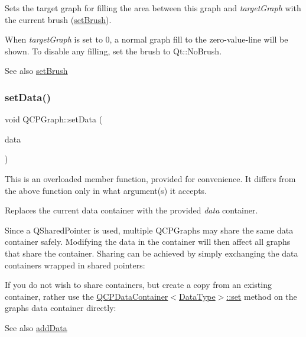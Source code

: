Sets the target graph for filling the area between this graph and {\itshape target\+Graph} with the current brush (\hyperlink{classQCPAbstractPlottable_a7a4b92144dca6453a1f0f210e27edc74}{set\+Brush}).

When {\itshape target\+Graph} is set to 0, a normal graph fill to the zero-\/value-\/line will be shown. To disable any filling, set the brush to Qt\+::\+No\+Brush.

\begin{DoxySeeAlso}{See also}
\hyperlink{classQCPAbstractPlottable_a7a4b92144dca6453a1f0f210e27edc74}{set\+Brush} 
\end{DoxySeeAlso}
\mbox{\label{classQCPGraph_a1eae9429a316b008e2d99b2d65a54395}} 
\subsubsection{\texorpdfstring{set\+Data()}{setData()}\hspace{0.1cm}{\footnotesize\ttfamily [1/2]}}
{\footnotesize\ttfamily void Q\+C\+P\+Graph\+::set\+Data (\begin{DoxyParamCaption}\item[{Q\+Shared\+Pointer$<$ \hyperlink{classQCPDataContainer}{Q\+C\+P\+Graph\+Data\+Container} $>$}]{data }\end{DoxyParamCaption})}

This is an overloaded member function, provided for convenience. It differs from the above function only in what argument(s) it accepts.

Replaces the current data container with the provided {\itshape data} container.

Since a Q\+Shared\+Pointer is used, multiple Q\+C\+P\+Graphs may share the same data container safely. Modifying the data in the container will then affect all graphs that share the container. Sharing can be achieved by simply exchanging the data containers wrapped in shared pointers\+: 
\begin{DoxyCodeInclude}
\end{DoxyCodeInclude}
 If you do not wish to share containers, but create a copy from an existing container, rather use the \hyperlink{classQCPDataContainer_ae7042bd534fc3ce7befa2ce3f790b5bf}{Q\+C\+P\+Data\+Container$<$\+Data\+Type$>$\+::set} method on the graph\textquotesingle{}s data container directly\+: 
\begin{DoxyCodeInclude}
\end{DoxyCodeInclude}
 \begin{DoxySeeAlso}{See also}
\hyperlink{classQCPGraph_ae0555c0d3fe0fa7cb8628f88158d420f}{add\+Data} 
\end{DoxySeeAlso}
\mbox{\label{classQCPGraph_a73578d786532132310a926c3cd529b29}} 
